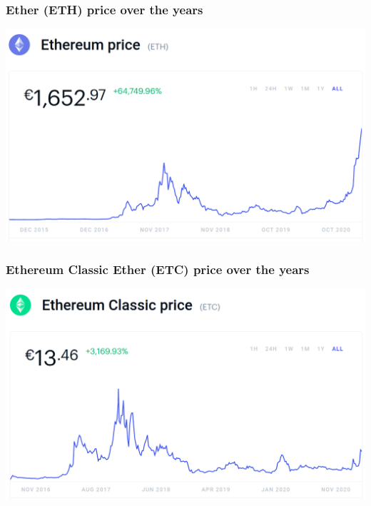 \documentclass[11pt]{beamer}  %
\begin{document}
\begin{frame}\frametitle{Ether (ETH) price over the years}

  \begin{center}
    \includegraphics[scale=0.29,clip=false]{pictures/ether-chart.png}
  \end{center}

\end{frame}

\begin{frame}\frametitle{Ethereum Classic Ether (ETC) price over the years}

  \begin{center}
    \includegraphics[scale=0.29,clip=false]{pictures/ether-classic-chart.png}
  \end{center}

\end{frame}
\end{document}
